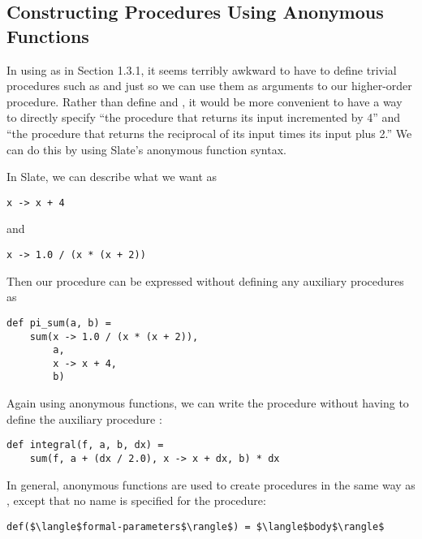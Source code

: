 \subsection{Constructing Procedures Using Anonymous Functions}

In using  as in Section 1.3.1, it seems terribly awkward to have to define trivial procedures such as  and  just so we can use them as arguments to our higher-order procedure. Rather than define  and , it would be more convenient to have a way to directly specify ``the procedure that returns its input incremented by 4'' and ``the procedure that returns the reciprocal of its input times its input plus 2.'' We can do this by using Slate's anonymous function syntax.

In Slate, we can describe what we want as

\begin{lstlisting}[style=slate]
x -> x + 4
\end{lstlisting}

and

\begin{lstlisting}[style=slate]
x -> 1.0 / (x * (x + 2))
\end{lstlisting}

Then our  procedure can be expressed without defining any auxiliary procedures as

\begin{lstlisting}[style=slate]
def pi_sum(a, b) =
    sum(x -> 1.0 / (x * (x + 2)), 
        a,
        x -> x + 4,
        b)
\end{lstlisting}

Again using anonymous functions, we can write the  procedure without having to define the auxiliary procedure :

\begin{lstlisting}[style=slate]
def integral(f, a, b, dx) =
    sum(f, a + (dx / 2.0), x -> x + dx, b) * dx
\end{lstlisting}

In general, anonymous functions are used to create procedures in the same way as , except that no name is specified for the procedure:

\begin{lstlisting}[style=plain]
def($\langle$formal-parameters$\rangle$) = $\langle$body$\rangle$
\end{lstlisting}

